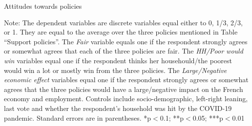 \begin{framefont}{\small}
\begin{frame}{}%
\begin{table}[h!]
\caption{Attitudes towards policies}
\begin{center}
\scalebox{.7}{}
\end{center}
	{\scriptsize Note: The dependent variables are discrete variables equal either to 0, 1/3, 2/3, or 1. They are equal to the average over the three policies mentioned in Table ``Support policies''. The \textit{Fair} variable equals one if the respondent strongly agrees or somewhat agrees that each of the three policies are fair. The \textit{HH/Poor would win} variables equal one if the respondent thinks her househould/the poorest would win a lot or mostly win from the three policies. The \textit{Large/Negative economic effect} variables equal one if the respondent strongly agrees or somewhat agrees that the three policies would have a large/negative impact on the French economy and employment. 
	\newline Controls include socio-demographic, left-right leaning, last vote and whether the respondent's household was hit by the COVID-19 pandemic. Standard errors are in parentheses. *p$<$0.1; **p$<$0.05; ***p$<$0.01}
\end{table}
\end{frame}



\end{framefont}
